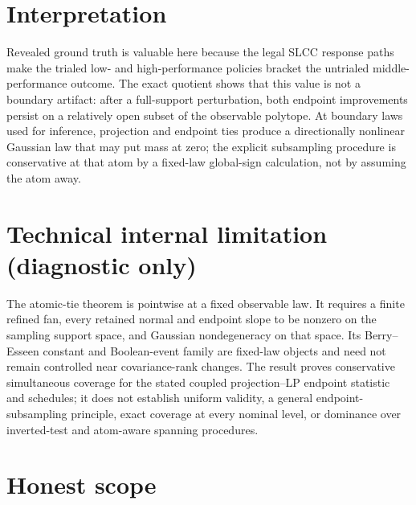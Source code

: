 \documentclass{article}
\begin{document}
\section{Interpretation}

Revealed ground truth is valuable here because the legal SLCC response paths make the trialed low- and high-performance policies bracket the untrialed middle-performance outcome. The exact quotient shows that this value is not a boundary artifact: after a full-support perturbation, both endpoint improvements persist on a relatively open subset of the observable polytope. At boundary laws used for inference, projection and endpoint ties produce a directionally nonlinear Gaussian law that may put mass at zero; the explicit subsampling procedure is conservative at that atom by a fixed-law global-sign calculation, not by assuming the atom away.

\section*{Technical internal limitation (diagnostic only)}

The atomic-tie theorem is pointwise at a fixed observable law. It requires a finite refined fan, every retained normal and endpoint slope to be nonzero on the sampling support space, and Gaussian nondegeneracy on that space. Its Berry--Esseen constant and Boolean-event family are fixed-law objects and need not remain controlled near covariance-rank changes. The result proves conservative simultaneous coverage for the stated coupled projection--LP endpoint statistic and schedules; it does not establish uniform validity, a general endpoint-subsampling principle, exact coverage at every nominal level, or dominance over inverted-test and atom-aware spanning procedures.

\section{Honest scope}
\end{document}
